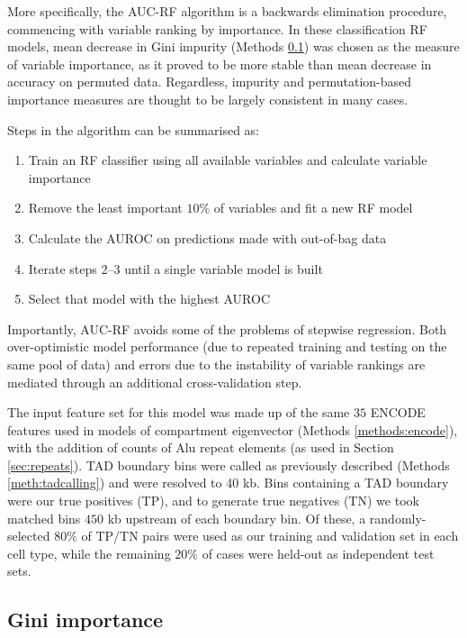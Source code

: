 \documentclass[a4paper,11pt,oneside]{book}
\begin{document}
More specifically, the AUC-RF algorithm is a backwards elimination procedure, commencing with variable ranking by importance. In these classification RF models, mean decrease in Gini impurity (Methods \ref{meth:gini}) was chosen as the measure of variable importance, as it proved to be more stable than mean decrease in accuracy on permuted data.\cite{Calle2011} Regardless, impurity and permutation-based importance measures are thought to be largely consistent in many cases.\cite{Liaw2002, Hastie2001}

Steps in the algorithm can be summarised as:\cite{Calle2011}
\begin{enumerate}
\item Train an RF classifier using all available variables and calculate variable importance
\item Remove the least important $10\%$ of variables and fit a new RF model
\item Calculate the AUROC on predictions made with out-of-bag data
\item Iterate steps 2--3 until a single variable model is built
\item Select that model with the highest AUROC
\end{enumerate} \vspace{.1em}

Importantly, AUC-RF avoids some of the problems of stepwise regression. Both over-optimistic model performance (due to repeated training and testing on the same pool of data) and errors due to the instability of variable rankings are mediated through an additional cross-validation step.\cite{Calle2011}

The input feature set for this model was made up of the same $35$ ENCODE features used in models of compartment eigenvector (Methods \ref{methods:encode}), with the addition of counts of Alu repeat elements (as used in Section \ref{sec:repeats}). TAD boundary bins were called as previously described (Methods \ref{meth:tadcalling}) and were resolved to 40 kb. Bins containing a TAD boundary were our true positives (TP), and to generate true negatives (TN) we took matched bins $450$ kb upstream of each boundary bin. Of these, a randomly-selected $80\%$ of TP/TN pairs were used as our training and validation set in each cell type, while the remaining $20\%$ of cases were held-out as independent test sets.

\subsection{Gini importance}\label{meth:gini}
\end{document}
